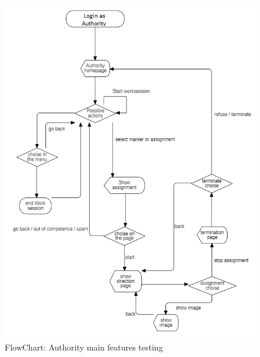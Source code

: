 \newpage
\begin{figure}[H]
\centering
\includegraphics{Images/FlowChartAuthority.png}
\caption{\label{fig:ComWI}FlowChart: Authority main features testing}
\end{figure}


